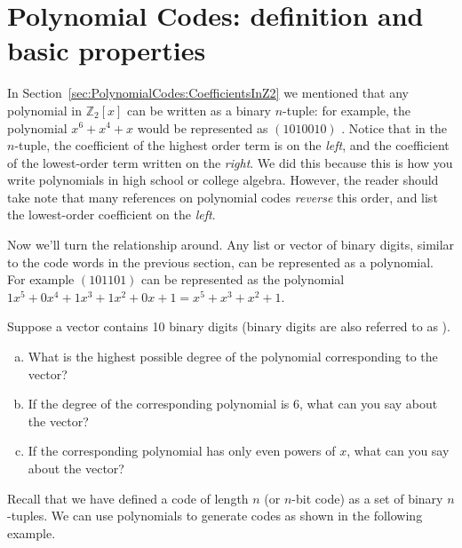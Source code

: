 \section{Polynomial Codes: definition and basic properties}
\label{sec:PolynomialCodes:DefinitionAndProperties}

In Section~\ref{sec:PolynomialCodes:CoefficientsInZ2} we mentioned that  any polynomial in $\mathbb{Z}_2[x]$ can be written as a binary $n$-tuple: for example, the polynomial $x^6 + x^4 + x$ would be represented as $(1010010)$ . Notice that in the $n$-tuple, the coefficient of the highest order term is on the \emph{left}, and the coefficient of the lowest-order term written on the \emph{right}.  We did this because this is how you write polynomials in high school or college algebra.  However, the reader should take note that many references on polynomial codes  \emph{reverse} this order, and list the lowest-order coefficient on the \emph{left}.

Now we'll turn the relationship around. Any list or vector of binary digits, similar to the code words in the previous section, can be represented as a polynomial. For example $(101101)$ can be represented as the polynomial $1x^5 + 0x^4 + 1x^3 + 1x^2 + 0x + 1 = x^5 + x^3 + x^2 + 1$.  

\begin{exercise}{}
Suppose a vector contains 10 binary digits (binary digits are also referred to as ).
\begin{enumerate}[(a)]
\item
 What is the highest possible degree of the polynomial corresponding to the vector?
\item
If the degree of the corresponding polynomial is 6, what can you say about the vector?
\item
If the corresponding polynomial has only even powers of $x$, what can you say about the vector?
\end{enumerate}
\end{exercise}

Recall that we have defined a code of length $n$ (or $n$-bit code) as a set of binary $n$-tuples.  We can use polynomials to generate codes as shown in the following example. 

